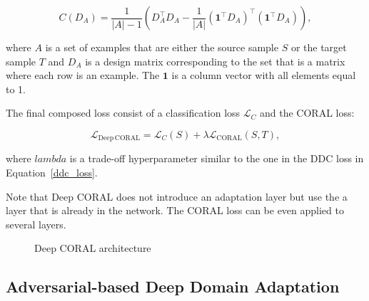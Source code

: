 \begin{equation}
	C(D_A) = \frac{1}{|A| - 1} (D_A^\top D_A
	- \frac{1}{|A|} (\mathbf{1}^\top D_A)^\top (\mathbf{1}^\top D_A)),
	\label{deep_coral_loss}
\end{equation}

where \(A\) is a set of examples
that are either the source sample \(S\) or the target sample \(T\)
and \(D_A\) is a design matrix corresponding to the set
that is a matrix where each row is an example.
The \(\mathbf{1}\) is a column vector with all elements equal to 1.

The final composed loss consist of a classification loss \(\mathcal{L}_C\)
and the CORAL loss:

\begin{equation}
	\mathcal{L}_{\mathrm{Deep\,CORAL}}
	= \mathcal{L}_C(S) + \lambda \mathcal{L}_{\mathrm{CORAL}}(S, T),
\end{equation}

where \(lambda\) is a trade-off hyperparameter similar to the one in the DDC loss in Equation~\ref{ddc_loss}.

Note that Deep CORAL does not introduce an adaptation layer
but use the a layer that is already in the network.
The CORAL loss can be even applied to several layers.

\begin{figure}
\begin{center}
\end{center}
\caption{Deep CORAL architecture}
\end{figure}

\subsection{Adversarial-based Deep Domain Adaptation}
\label{adversarial_da}


